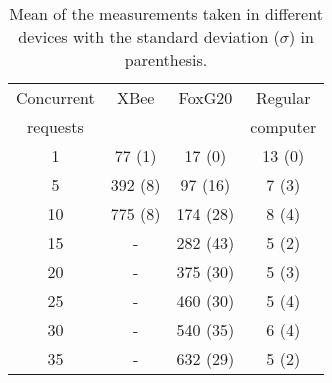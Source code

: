 \begin{table}[htbp]
    \caption{Mean of the measurements taken in different devices with the standard deviation ($\sigma$) in parenthesis.}
    \centering
    \begin{tabular}{|c|c|c|c|}
      \hline
      Concurrent & XBee & FoxG20 & Regular \\
      requests   &  & &  computer \\
      \hline
      1  &  77 (1)	&  17 (0)  &  13 (0) \\
      5  & 392 (8)	&  97 (16) &   7 (3) \\
      10 & 775 (8)	& 174 (28) &   8 (4) \\
      15 &  -	& 282 (43) &   5 (2) \\
      20 &  -	& 375 (30) &   5 (3) \\
      25 &  -	& 460 (30) &   5 (4) \\
      30 &  -	& 540 (35) &   6 (4) \\
      35 &  -	& 632 (29) &   5 (2) \\
      \hline
    \end{tabular}
    \label{tab:timeMeasures}
\end{table}